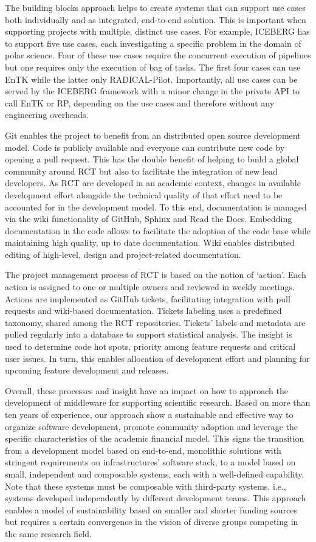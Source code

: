 \documentclass[preprint,12pt, a4paper]{elsarticle}
\begin{document}
The building blocks approach helps to create systems that can support use
cases both individually and as integrated, end-to-end solution. This is
important when supporting projects with multiple, distinct use cases. For
example, ICEBERG has to support five use cases, each investigating a specific
problem in the domain of polar science. Four of these use cases require the
concurrent execution of pipelines but one requires only the execution of bag
of tasks. The first four cases can use EnTK while the latter only
RADICAL-Pilot. Importantly, all use cases can be served by the ICEBERG
framework with a minor change in the private API to call EnTK or RP,
depending on the use cases and therefore without any engineering overheads.

Git enables the project to benefit from an distributed open source
development model. Code is publicly available and everyone can contribute new
code by opening a pull request. This has the double benefit of helping to
build a global community around RCT but also to facilitate the integration of
new lead developers. As RCT are developed in an academic context, changes in
available development effort alongside the technical quality of that effort
need to be accounted for in the development model. To this end, documentation
is managed via the wiki functionality of GitHub, Sphinx and Read the Docs.
Embedding documentation in the code allows to facilitate the adoption of the
code base while maintaining high quality, up to date documentation. Wiki
enables distributed editing of high-level, design and project-related
documentation.

The project management process of RCT is based on the notion of `action'.
Each action is assigned to one or multiple owners and reviewed in weekly
meetings. Actions are implemented as GitHub tickets, facilitating integration
with pull requests and wiki-based documentation. Tickets labeling uses a
predefined taxonomy, shared among the RCT repositories. Tickets' labels and
metadata are pulled regularly into a database to support statistical
analysis. The insight is used to determine code hot spots, priority among
feature requests and critical user issues. In turn, this enables allocation
of development effort and planning for upcoming feature development and
releases.

Overall, these processes and insight have an impact on how to approach the
development of middleware for supporting scientific research. Based on more
than ten years of experience, our approach show a sustainable and effective
way to organize software development, promote community adoption and leverage
the specific characteristics of the academic financial model. This signs the
transition from a development model based on end-to-end, monolithic solutions
with stringent requirements on infrastructures' software stack, to a model
based on small, independent and composable systems, each with a well-defined
capability. Note that these systems must be composable with third-party
systems, i.e., systems developed independently by different development
teams. This approach enables a model of sustainability based on smaller and
shorter funding sources but requires a certain convergence in the vision of
diverse groups competing in the same research field.
\end{document}
